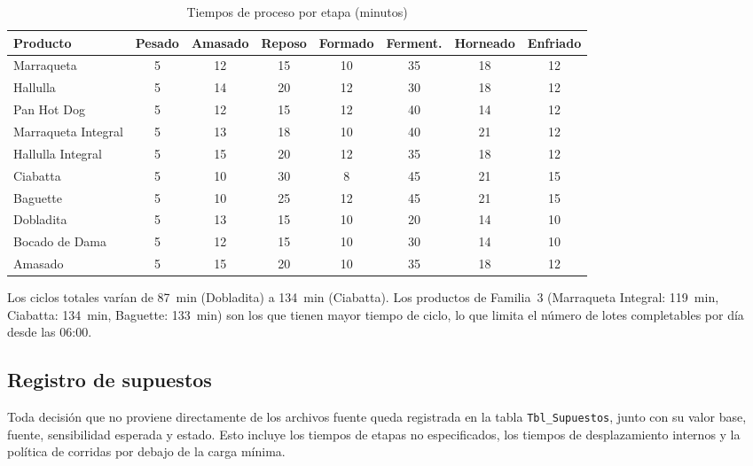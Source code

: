 \documentclass[12pt]{article}
\begin{document}
\begin{table}[H]
\centering
\caption{Tiempos de proceso por etapa (minutos)}
\label{tab:etapas}
\renewcommand{\arraystretch}{1.3}
\begin{tabularx}{\textwidth}{Xccccccc}
\toprule
\rowcolor{tabhead}
\color{white}\textbf{Producto} &
\color{white}\textbf{Pesado} &
\color{white}\textbf{Amasado} &
\color{white}\textbf{Reposo} &
\color{white}\textbf{Formado} &
\color{white}\textbf{Ferment.} &
\color{white}\textbf{Horneado} &
\color{white}\textbf{Enfriado} \\
\midrule
\rowcolor{tabrow} Marraqueta          & 5 & 12 & 15 & 10 & 35 & 18 & 12 \\
Hallulla                              & 5 & 14 & 20 & 12 & 30 & 18 & 12 \\
\rowcolor{tabrow} Pan Hot Dog         & 5 & 12 & 15 & 12 & 40 & 14 & 12 \\
Marraqueta Integral                   & 5 & 13 & 18 & 10 & 40 & 21 & 12 \\
\rowcolor{tabrow} Hallulla Integral   & 5 & 15 & 20 & 12 & 35 & 18 & 12 \\
Ciabatta                              & 5 & 10 & 30 &  8 & 45 & 21 & 15 \\
\rowcolor{tabrow} Baguette            & 5 & 10 & 25 & 12 & 45 & 21 & 15 \\
Dobladita                             & 5 & 13 & 15 & 10 & 20 & 14 & 10 \\
\rowcolor{tabrow} Bocado de Dama      & 5 & 12 & 15 & 10 & 30 & 14 & 10 \\
Amasado                               & 5 & 15 & 20 & 10 & 35 & 18 & 12 \\
\bottomrule
\end{tabularx}
\end{table}

Los ciclos totales varían de 87~min (Dobladita) a 134~min (Ciabatta). Los productos de Familia~3 (Marraqueta Integral: 119~min, Ciabatta: 134~min, Baguette: 133~min) son los que tienen mayor tiempo de ciclo, lo que limita el número de lotes completables por día desde las 06:00.

\subsection{Registro de supuestos}

Toda decisión que no proviene directamente de los archivos fuente queda registrada en la tabla \texttt{Tbl\_Supuestos}, junto con su valor base, fuente, sensibilidad esperada y estado. Esto incluye los tiempos de etapas no especificados, los tiempos de desplazamiento internos y la política de corridas por debajo de la carga mínima.
\end{document}
